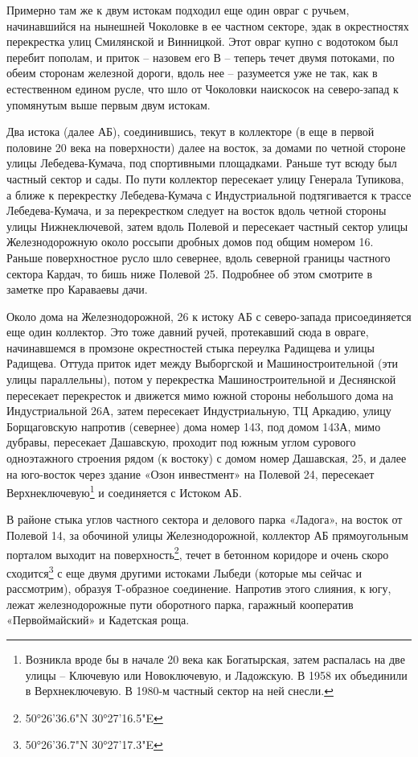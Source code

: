 Примерно там же к двум истокам подходил еще один овраг с ручьем, начинавшийся на нынешней Чоколовке в ее частном секторе, эдак в окрестностях перекрестка улиц Смилянской и Винницкой. Этот овраг купно с водотоком был перебит пополам, и приток – назовем его В – теперь течет двумя потоками, по обеим сторонам железной дороги, вдоль нее – разумеется уже не так, как в естественном едином русле, что шло от Чоколовки наискосок на северо-запад к упомянутым выше первым двум истокам. 

Два истока (далее АБ), соединившись, текут в коллекторе (в еще в первой половине 20 века на поверхности) далее на восток, за домами по четной стороне улицы Лебедева-Кумача, под спортивными площадками. Раньше тут всюду был частный сектор и сады. По пути коллектор пересекает улицу Генерала Тупикова, а ближе к перекрестку Лебедева-Кумача с Индустриальной подтягивается к трассе Лебедева-Кумача, и за перекрестком следует на восток вдоль четной стороны улицы Нижнеключевой, затем вдоль Полевой и пересекает частный сектор улицы Железнодорожную около россыпи дробных домов под общим номером 16. Раньше поверхностное русло шло севернее, вдоль северной границы частного сектора Кардач, то бишь ниже Полевой 25. Подробнее об этом смотрите в заметке про Караваевы дачи.

Около дома на Железнодорожной, 26 к истоку АБ с северо-запада присоединяется еще один коллектор. Это тоже давний ручей, протекавший сюда в овраге, начинавшемся в промзоне окрестностей стыка переулка Радищева и улицы Радищева. Оттуда приток идет между Выборгской и Машиностроительной (эти улицы параллельны), потом у перекрестка Машиностроительной и Деснянской пересекает перекресток и движется мимо южной стороны небольшого дома на Индустриальной 26А, затем пересекает Индустриальную, ТЦ Аркадию, улицу Борщаговскую напротив (севернее) дома номер 143, под домом 143А, мимо дубравы, пересекает Дашавскую, проходит под южным углом сурового одноэтажного строения рядом (к востоку) с домом номер Дашавская, 25, и далее на юго-восток через здание «Озон инвестмент» на Полевой 24, пересекает Верхнеключевую\footnote{Возникла вроде бы в начале 20 века как Богатырская, затем распалась на две улицы – Ключевую или Новоключевую, и Ладожскую. В 1958 их объединили в Верхнеключевую. В 1980-м частный сектор на ней снесли.} и соединяется с Истоком АБ.

В районе стыка углов частного сектора и делового парка «Ладога», на восток от Полевой 14, за обочиной улицы Железнодорожной, коллектор АБ прямоугольным порталом выходит на поверхность\footnote{50°26'36.6"N 30°27'16.5"E},  течет в бетонном коридоре и очень скоро сходится\footnote{50°26'36.7"N 30°27'17.3"E} с еще двумя другими истоками Лыбеди (которые мы сейчас и рассмотрим), образуя Т-образное соединение. Напротив этого слияния, к югу, лежат железнодорожные пути оборотного парка, гаражный кооператив «Первоймайский» и Кадетская роща.

